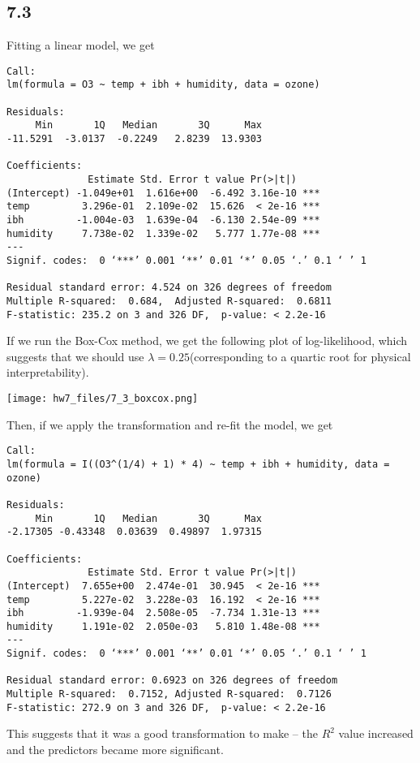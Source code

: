 \documentclass{article}
\begin{document}
\subsection*{7.3}
Fitting a linear model, we get 
\begin{verbatim}
Call:
lm(formula = O3 ~ temp + ibh + humidity, data = ozone)

Residuals:
     Min       1Q   Median       3Q      Max 
-11.5291  -3.0137  -0.2249   2.8239  13.9303 

Coefficients:
              Estimate Std. Error t value Pr(>|t|)    
(Intercept) -1.049e+01  1.616e+00  -6.492 3.16e-10 ***
temp         3.296e-01  2.109e-02  15.626  < 2e-16 ***
ibh         -1.004e-03  1.639e-04  -6.130 2.54e-09 ***
humidity     7.738e-02  1.339e-02   5.777 1.77e-08 ***
---
Signif. codes:  0 ‘***’ 0.001 ‘**’ 0.01 ‘*’ 0.05 ‘.’ 0.1 ‘ ’ 1

Residual standard error: 4.524 on 326 degrees of freedom
Multiple R-squared:  0.684,  Adjusted R-squared:  0.6811 
F-statistic: 235.2 on 3 and 326 DF,  p-value: < 2.2e-16
\end{verbatim}
If we run the Box-Cox method, we get the following plot of log-likelihood, which suggests that we should use $\lambda=0.25$(corresponding to a quartic root for physical interpretability). 

\texttt{[image: hw7\_files/7\_3\_boxcox.png]}

Then, if we apply the transformation and re-fit the model, we get 

\begin{verbatim}
Call:
lm(formula = I((O3^(1/4) + 1) * 4) ~ temp + ibh + humidity, data = ozone)

Residuals:
     Min       1Q   Median       3Q      Max 
-2.17305 -0.43348  0.03639  0.49897  1.97315 

Coefficients:
              Estimate Std. Error t value Pr(>|t|)    
(Intercept)  7.655e+00  2.474e-01  30.945  < 2e-16 ***
temp         5.227e-02  3.228e-03  16.192  < 2e-16 ***
ibh         -1.939e-04  2.508e-05  -7.734 1.31e-13 ***
humidity     1.191e-02  2.050e-03   5.810 1.48e-08 ***
---
Signif. codes:  0 ‘***’ 0.001 ‘**’ 0.01 ‘*’ 0.05 ‘.’ 0.1 ‘ ’ 1

Residual standard error: 0.6923 on 326 degrees of freedom
Multiple R-squared:  0.7152, Adjusted R-squared:  0.7126 
F-statistic: 272.9 on 3 and 326 DF,  p-value: < 2.2e-16
\end{verbatim}
This suggests that it was a good transformation to make -- the $R^2$ value increased and the predictors became more significant.
\end{document}
